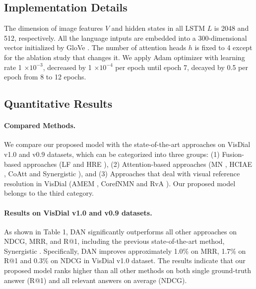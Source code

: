 \documentclass[11pt,a4paper]{article}
\begin{document}
\subsection{Implementation Details}
\label{sec:impdet}
The dimension of image features $V$ and hidden states in all LSTM $L$ is 2048 and 512, respectively. All the language intputs are embedded into a 300-dimensional vector initialized by GloVe \cite{pennington2014glove}. The number of attention heads $h$ is fixed to 4 except for the ablation study that changes it. We apply Adam optimizer \cite{kingma2014adam} with learning rate 1 $\times 10^{-3}$, decreased by 1 $\times 10^{-4}$ per epoch until epoch 7, decayed by 0.5 per epoch from 8 to 12 epochs.

\subsection{Quantitative Results}
\label{sec:quan}
\paragraph{Compared Methods.} We compare our proposed model with the state-of-the-art approaches on VisDial v1.0 and v0.9 datasets, which can be categorized into three groups: (1) Fusion-based approaches (LF and HRE \cite{das2017visual}), (2) Attention-based approaches (MN \cite{das2017visual}, HCIAE \cite{lu2017best}, CoAtt \cite{wu2018you} and Synergistic \cite{guo2019image}), and (3) Approaches that deal with visual reference resolution in VisDial (AMEM \cite{seo2017visual}, CorefNMN \cite{kottur2018visual} and RvA \cite{niu2018recursive}). Our proposed model belongs to the third category.

\paragraph{Results on VisDial v1.0 and v0.9 datasets.} As shown in Table 1, DAN significantly outperforms all other approaches on NDCG, MRR, and R@1, including the previous state-of-the-art method, Synergistic \cite{guo2019image}. Specifically, DAN improves approximately 1.0\% on MRR, 1.7\% on R@1 and 0.3\% on NDCG in VisDial v1.0 dataset. The results indicate that our proposed model ranks higher than all other methods on both single ground-truth answer (R@1) and all relevant answers on average (NDCG).
\end{document}
